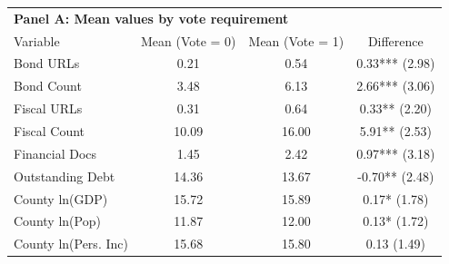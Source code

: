 \begin{table}[ht]
\centering
\begin{tabular*}{\textwidth}{@{\extracolsep{\fill}}lccc}
\multicolumn{4}{l}{\textbf{Panel A: Mean values by vote requirement}}\\

\addlinespace
  \hline
Variable & Mean (Vote = 0) & Mean (Vote = 1) & Difference \\ 
  \hline
Bond URLs & 0.21 & 0.54 & 0.33*** (2.98) \\ 
  Bond Count & 3.48 & 6.13 & 2.66*** (3.06) \\ 
  Fiscal URLs & 0.31 & 0.64 & 0.33** (2.20) \\ 
  Fiscal Count & 10.09 & 16.00 & 5.91** (2.53) \\ 
  Financial Docs & 1.45 & 2.42 & 0.97*** (3.18) \\ 
  Outstanding Debt & 14.36 & 13.67 & -0.70** (2.48) \\ 
  County ln(GDP) & 15.72 & 15.89 & 0.17* (1.78) \\ 
  County ln(Pop) & 11.87 & 12.00 & 0.13* (1.72) \\ 
  County ln(Pers. Inc) & 15.68 & 15.80 & 0.13 (1.49) \\ 
   \hline
\end{tabular*}
\end{table}
